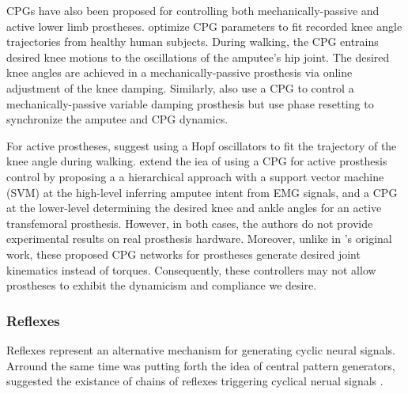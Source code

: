 CPGs have also been proposed for controlling both mechanically-passive and
active lower limb prostheses.  \citet{nandi2009development} optimize CPG
parameters to fit recorded knee angle trajectories from healthy human subjects.
During walking, the CPG entrains desired knee motions to the oscillations of the
amputee's hip joint. The desired knee angles are achieved in a
mechanically-passive prosthesis via online adjustment of the knee damping.
Similarly, \citet{torrealba2010through, mora2012cybernetic} also use a CPG to
control a mechanically-passive variable damping prosthesis but use phase
resetting to synchronize the amputee and CPG dynamics. 

For active prostheses, \citet{geng2012design} suggest using a Hopf oscillators
to fit the trajectory of the knee angle during walking. \citet{guo2010study}
extend the iea of using a CPG for active prosthesis control by proposing a a
hierarchical approach with a support vector machine (SVM) at the high-level
inferring amputee intent from EMG signals, and a CPG at the lower-level
determining the desired knee and ankle angles for an active transfemoral
prosthesis. However, in both cases, the authors do not provide experimental
results on real prosthesis hardware. Moreover, unlike in
\citeauthor{taga1991self}'s original work, these proposed CPG networks for
prostheses generate desired joint kinematics instead of torques. Consequently,
these controllers may not allow prostheses to exhibit the dynamicism and
compliance we desire.

\begin{comment}
There exists many models of CPGs of varying complexity: from sub-neural level
models that simulate how ion transport influences signal generation
\citep{hellgren1992computer, traven1993computer} to neuron level models that
investigate how the topology of neuron networks governs rhythmic activity
\citep{buchanan1992neural, williams1992phase}, to high-level models that examine
the role of interconnections between pools of neurons
\citep{matsuoka1987mechanisms, cohen1982nature}.
\citeauthor{matsuoka1987mechanisms}'s model is especially interesting as
\citet{taga1991self} uses this CPG architecture to achieve robust biped
locomotion in simulation. 
\end{comment}

\subsubsection{Reflexes}
Reflexes represent an alternative mechanism for generating cyclic
neural signals. Arround the same time \citeauthor{brown1911intrinsic} was
putting forth the idea of central pattern generators,
\citeauthor{sherrington1910integrative} suggested the existance of chains of
reflexes triggering cyclical nerual signals \citep{sherrington1910integrative,
sherrington1910flexion}.

